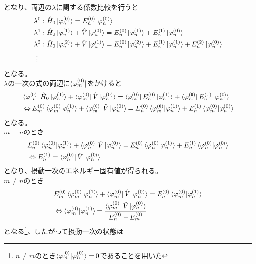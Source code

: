 \documentclass{jsarticle}  %
\numberwithin{equation}{section} %
\numberwithin{figure}{section}
\begin{document}
    となり、両辺の$\lambda$に関する係数比較を行うと
    \begin{align}
        &\lambda^0: \hat{H}_0 \ket{\varphi_n^{(0)}} = E_n^{(0)} \ket{\varphi_n^{(0)}} \\
        &\lambda^1:\hat{H}_0 \ket{\varphi_n^{(1)}} + \hat{V}\ket{\varphi_n^{(0)}} = E_n^{(0)}\ket{\varphi_n^{(1)}} + E_n^{(1)}\ket{\varphi_n^{(0)}}\\
        &\lambda^2:\hat{H}_0 \ket{\varphi_n^{(2)}} + \hat{V}\ket{\varphi_n^{(1)}} = E_n^{(0)}\ket{\varphi_n^{(2)}} + E_n^{(1)}\ket{\varphi_n^{(1)}} + E_n^{(2)}\ket{\varphi_n^{(0)}}\\
        &\ \vdots \notag 
    \end{align}
    となる。\\
    $\lambda$の一次の式の両辺に$\bra{\varphi_m^{(0)}}$をかけると
    \begin{align}
        &\bra{\varphi_m^{(0)}}\hat{H}_0 \ket{\varphi_n^{(1)}} + \bra{\varphi_m^{(0)}}\hat{V}\ket{\varphi_n^{(0)}} = \bra{\varphi_m^{(0)}}E_n^{(0)}\ket{\varphi_n^{(1)}} + \bra{\varphi_m^{(0)}}E_n^{(1)}\ket{\varphi_n^{(0)}} \notag \\
        &\Leftrightarrow E_m^{(0)}\braket{\varphi_m^{(0)}|\varphi_n^{(1)}} + \bra{\varphi_m^{(0)}}\hat{V}\ket{\varphi_n^{(0)}} = E_n^{(0)}\braket{\varphi_m^{(0)}|\varphi_n^{(1)}} + E_n^{(1)}\braket{\varphi_m^{(0)}|\varphi_n^{(0)}}
    \end{align}
    となる。\\
    $m=n$のとき
    \begin{align}
        &E_n^{(0)}\braket{\varphi_n^{(0)}|\varphi_n^{(1)}} + \bra{\varphi_n^{(0)}}\hat{V}\ket{\varphi_n^{(0)}} = E_n^{(0)}\braket{\varphi_n^{(0)}|\varphi_n^{(1)}} + E_n^{(1)}\braket{\varphi_n^{(0)}|\varphi_n^{(0)}} \notag \\
        &\Leftrightarrow E_n^{(1)} = \bra{\varphi_n^{(0)}}\hat{V}\ket{\varphi_n^{(0)}}
    \end{align}
    となり、摂動一次のエネルギー固有値が得られる。\\
    $m\ne n$のとき
    \begin{align}
        &E_m^{(0)}\braket{\varphi_m^{(0)}|\varphi_n^{(1)}} + \bra{\varphi_m^{(0)}}\hat{V}\ket{\varphi_n^{(0)}} = E_n^{(0)}\braket{\varphi_m^{(0)}|\varphi_n^{(1)}} \notag \\
        &\Leftrightarrow  \braket{\varphi_m^{(0)}|\varphi_n^{(1)}} = \frac{\bra{\varphi_m^{(0)}}\hat{V}\ket{\varphi_n^{(0)}}}{E_n^{(0)}-E_m^{(0)}}
    \end{align}
    となる\footnote{$n \ne m$のとき$\braket{\varphi_m^{(0)}|\varphi_n^{(0)}}=0$であることを用いた}、したがって摂動一次の状態は
\end{document}
